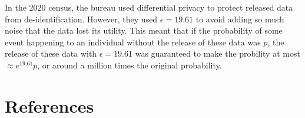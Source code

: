 \documentclass[
  letterpaper,
]{scrbook}
\theoremstyle{definition}
\theoremstyle{plain}
\theoremstyle{plain}
\theoremstyle{remark}
\begin{document}
In the 2020 census, the bureau used differential privacy to protect
released data from de-identification. However, they used
\(\epsilon = 19.61\) to avoid adding so much noise that the data lost
its utility. This meant that if the probability of some event happening
to an individual without the release of these data was \(p\), the
release of these data with \(\epsilon = 19.61\) was guaranteed to make
the probility at most \(\approx e^{19.61} p\), or around a million times
the original probability.


\chapter*{References}\label{references}

\end{document}
